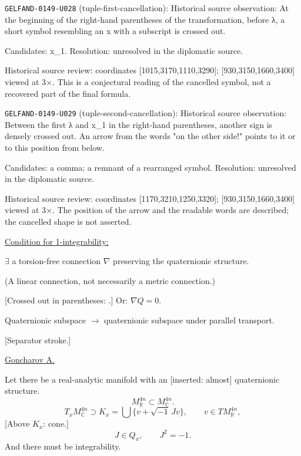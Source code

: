 \noindent\texttt{GELFAND-0149-U028} (tuple-first-cancellation): Historical source observation: At the beginning of the right-hand parentheses of the transformation, before λ, a short symbol resembling an x with a subscript is crossed out.\par
Candidates: x\_1. Resolution: unresolved in the diplomatic source.\par
Historical source review: coordinates [1015,3170,1110,3290]; [930,3150,1660,3400] viewed at 3×. This is a conjectural reading of the cancelled symbol, not a recovered part of the final formula.\par

\noindent\texttt{GELFAND-0149-U029} (tuple-second-cancellation): Historical source observation: Between the first λ and x\_1 in the right-hand parentheses, another sign is densely crossed out. An arrow from the words "on the other side!" points to it or to this position from below.\par
Candidates: a comma; a remnant of a rearranged symbol. Resolution: unresolved in the diplomatic source.\par
Historical source review: coordinates [1170,3210,1250,3320]; [930,3150,1660,3400] viewed at 3×. The position of the arrow and the readable words are described; the cancelled shape is not asserted.\par



\underline{Condition for 1-integrability:}

$\exists$ a torsion-free connection $\nabla$ preserving the quaternionic structure.

(A linear connection, not necessarily a metric connection.)

[Crossed out in parentheses:
.]
Or: $\nabla Q=0$.

Quaternionic subspace $\longrightarrow$ quaternionic subspace under parallel transport.

[Separator stroke.]

\underline{Goncharov A.}

Let there be a real-analytic manifold with an [inserted: almost] quaternionic structure.
\begin{equation*}
M_{\mathbb R}^{4n}\subset M_{\mathbb C}^{4n}.
\end{equation*}
\begin{equation*}
T_xM_{\mathbb C}^{4n}\supset K_x
=\bigcup\{v+\sqrt{-1}\,Jv\},\qquad v\in TM_{\mathbb R}^{4n},
\end{equation*}
[Above $K_x$: cone.]
\begin{equation*}
J\in Q_x,\qquad J^2=-1.
\end{equation*}
And there must be integrability.

